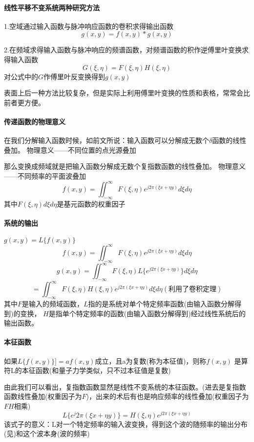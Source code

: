 \documentclass[UTF8]{ctexart}
\newcommand{\dbinf}{\iint_{-\infty}^{\infty}}
\begin{document}
\paragraph{线性平移不变系统两种研究方法}

1.空域通过输入函数与脉冲响应函数的卷积求得输出函数
\[
g(x,y)=f(x,y)*g(x,y)    
    \]
        
2.在频域求得输入函数与脉冲响应的频谱函数，对频谱函数的积作逆傅里叶变换求得输入函数
\[
G(\xi,\eta)=F(\xi,\eta)H(\xi,\eta)    
\]    
对公式中的$G$作傅里叶反变换得到$g(x,y)$

表面上后一种方法比较复杂，但是实际上利用傅里叶变换的性质和表格，常常会比前者更方便。

\paragraph{传递函数的物理意义}
在我们分解输入函数时候，如前文所说：输入函数可以分解成无数个$\delta$函数的线性叠加。
物理意义——不同位置的点光源叠加

那么变换成频域就是把输入函数分解成无数个复指数函数的线性叠加。
物理意义——不同频率的平面波叠加
\[
    f(x,y)=\dbinf F(\xi,\eta)e^{j2\pi(\xi x+\eta y)}d\xi d\eta
    \]
其中$F(\xi,\eta)d\xi d\eta$是基元函数的权重因子
\paragraph{系统的输出}
$g(x,y)=L\{f(x,y)\}$
\[f(x,y)=\dbinf F(\xi,\eta)e^{j2\pi(\xi x+\eta y)}d\xi d\eta
    \]
\[g(x,y)=\dbinf F(\xi,\eta) L\{e^{j2\pi(\xi x+\eta y)}\}d\xi d\eta    
\]\[=\dbinf F(\xi,\eta)H(\xi,\eta)e^{j2\pi(\xi x+\eta y)}d\xi d\eta
(利用了卷积定理)
\]
其中$F$是输入的频域函数，$L$指的是系统对单个特定频率函数(由输入函数分解得到)的变换，
$H$是指单个特定频率的函数(由输入函数分解得到)经过线性系统后的输出函数。


\paragraph{本征函数}如果$L\{f(x,y)\}]=af(x,y)$成立，且a为复数(称为本征值)，则称$f(x,y)$
是算符L的本征函数(和量子力学类似，只不过本征值是复数)

由此我们可以看出，复指数函数显然是线性不变系统的本征函数。(进去是复指数函数线性叠加(权重因子为$F$)，出来的术后有也是响应频率的线性叠加(权重因子为$FH$相乘)
\[L\{e^j2\pi(\xi x+\eta y)\}=H(\xi,\eta)e^{j2\pi(\xi x+\eta y)}\]
该式子的意义：L对一个特定频率的输入波变换，得到这个波的随频率的输出分布(见)和这个波本身(波的频率)
\end{document}
